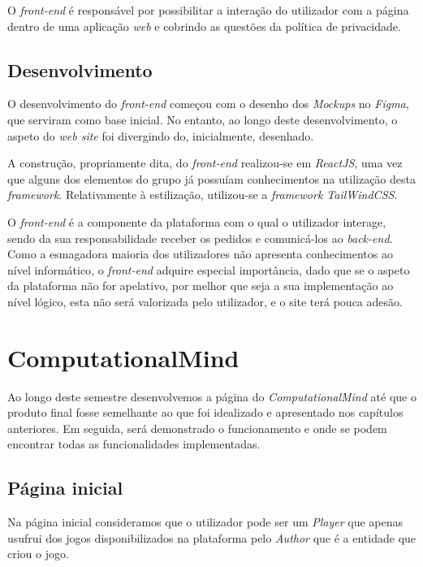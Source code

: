 \documentclass[11pt,a4paper]{report}
\begin{document}
O \emph{front-end} é responsável por possibilitar a interação do utilizador com a página dentro de uma aplicação \emph{web} e cobrindo as questões da política de privacidade.
\newpage
\section{Desenvolvimento}

O desenvolvimento do \emph{front-end} começou com o desenho dos \emph{Mockups} no \emph{Figma}, que serviram como base inicial. No entanto, ao longo deste desenvolvimento, o aspeto do \emph{web site} foi divergindo do, inicialmente, desenhado.

A construção, propriamente dita, do \emph{front-end} realizou-se em \emph{ReactJS}, uma vez que alguns dos elementos do grupo já possuíam conhecimentos na utilização desta \emph{framework}. Relativamente à estilização,  utilizou-se a \emph{framework TailWindCSS}.

O \emph{front-end} é a componente da plataforma com o qual o utilizador interage, sendo da sua responsabilidade receber os pedidos e comunicá-los ao \emph{back-end}. Como a esmagadora maioria dos utilizadores não apresenta conhecimentos ao nível informático, o \emph{front-end} adquire especial importância, dado que se o aspeto da plataforma não for apelativo, por melhor que seja a sua implementação ao nível lógico, esta não será valorizada pelo utilizador, e o site terá pouca adesão.

\chapter{ComputationalMind}

Ao longo deste semestre desenvolvemos a página do \emph{ComputationalMind} até que o produto final fosse semelhante ao que foi idealizado e apresentado nos capítulos anteriores. Em seguida, será demonstrado o funcionamento e onde se podem encontrar todas as funcionalidades implementadas.

\section{Página inicial}

Na página inicial consideramos que o utilizador pode ser um \emph{Player} que apenas usufrui dos jogos disponibilizados na plataforma pelo \emph{Author} que é a entidade que criou o jogo.\newline\newline
\end{document}
